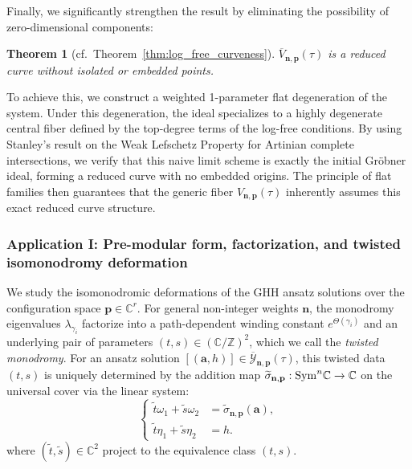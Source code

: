 \documentclass[11pt]{amsart}
\newtheorem{theorem}{Theorem}[section]
\theoremstyle{remark}
\numberwithin{equation}{section}
\newcommand{\Sym}{{\rm Sym}}
\begin{document}
Finally, we significantly strengthen the result by eliminating the possibility of zero-dimensional components:
\begin{theorem}[cf.~Theorem~\ref{thm:log_free_curveness}]
$\overline{V}_{\mathbf{n},\mathbf{p}}(\tau)$ is a reduced curve without isolated or embedded points.
\end{theorem}
To achieve this, we construct a weighted 1-parameter flat degeneration of the system. Under this degeneration, the ideal specializes to a highly degenerate central fiber defined by the top-degree terms of the log-free conditions. By using Stanley's result on the Weak Lefschetz Property for Artinian complete intersections, we verify that this naive limit scheme is exactly the initial Gr\"obner ideal, forming a reduced curve with no embedded origins. The principle of flat families then guarantees that the generic fiber $V_{\mathbf{n},\mathbf{p}}(\tau)$ inherently assumes this exact reduced curve structure.


\subsubsection{Application I: Pre-modular form, factorization, and twisted isomonodromy deformation}

We study the isomonodromic deformations of the GHH ansatz solutions over the configuration space $\mathbf{p} \in \mathbb{C}^r$. For general non-integer weights $\mathbf{n}$, the monodromy eigenvalues $\lambda_{\gamma_i}$ factorize into a path-dependent winding constant $e^{\Theta(\gamma_i)}$ and an underlying pair of parameters $(t,s) \in (\mathbb{C}/\mathbb{Z})^2$, which we call the \emph{twisted monodromy}. For an ansatz solution $[(\mathbf{a}, h)] \in \overline{\mathcal{Y}}_{\mathbf{n},\mathbf{p}}(\tau)$, this twisted data $(t,s)$ is uniquely determined by the addition map $\widetilde{\sigma}_{\mathbf{n},\mathbf{p}}:\Sym^n \mathbb{C} \rightarrow \mathbb{C}$ on the universal cover via the linear system:
\[
\begin{cases}
    \tilde{t} \omega_1 + \tilde{s} \omega_2 &= \widetilde{\sigma}_{\mathbf{n},\mathbf{p}}(\mathbf{a}), \\
    \tilde{t} \eta_1 + \tilde{s} \eta_2 &= h.
\end{cases}
\]
where $(\tilde{t}, \tilde{s}) \in \mathbb{C}^2$ project to the equivalence class $(t,s)$.
\end{document}

